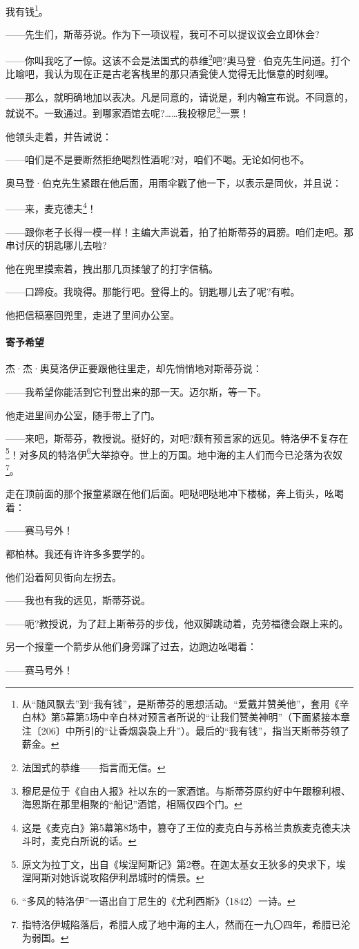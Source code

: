 \par 我有钱\footnote{从“随风飘去”到“我有钱”，是斯蒂芬的思想活动。“爱戴并赞美他”，套用《辛白林》第5幕第5场中辛白林对预言者所说的“让我们赞美神明”（下面紧接本章注〔206〕中所引的“让香烟袅袅上升”）。最后的“我有钱”，指当天斯蒂芬领了薪金。}。
\par ——先生们，斯蒂芬说。作为下一项议程，我可不可以提议议会立即休会?
\par ——你叫我吃了一惊。这该不会是法国式的恭维\footnote{法国式的恭维——指言而无信。}吧?奥马登·伯克先生问道。打个比喻吧，我认为现在正是古老客栈里的那只酒瓮使人觉得无比惬意的时刻哩。
\par ——那么，就明确地加以表决。凡是同意的，请说是，利内翰宣布说。不同意的，就说不。一致通过。到哪家酒馆去呢?……我投穆尼\footnote{穆尼是位于《自由人报》社以东的一家酒馆。与斯蒂芬原约好中午跟穆利根、海恩斯在那里相聚的“船记”酒馆，相隔仅四个门。}一票！
\par 他领头走着，并告诫说：
\par ——咱们是不是要断然拒绝喝烈性酒呢?对，咱们不喝。无论如何也不。
\par 奥马登·伯克先生紧跟在他后面，用雨伞戳了他一下，以表示是同伙，并且说：
\par ——来，麦克德夫\footnote{这是《麦克白》第5幕第8场中，篡夺了王位的麦克白与苏格兰贵族麦克德夫决斗时，麦克白所说的话。}！
\par ——跟你老子长得一模一样！主编大声说着，拍了拍斯蒂芬的肩膀。咱们走吧。那串讨厌的钥匙哪儿去啦?
\par 他在兜里摸索着，拽出那几页揉皱了的打字信稿。
\par ——口蹄疫。我晓得。那能行吧。登得上的。钥匙哪儿去了呢?有啦。
\par 他把信稿塞回兜里，走进了里间办公室。
\paragraph*{寄予希望}
\par 杰·杰·奥莫洛伊正要跟他往里走，却先悄悄地对斯蒂芬说：
\par ——我希望你能活到它刊登出来的那一天。迈尔斯，等一下。
\par 他走进里间办公室，随手带上了门。
\par ——来吧，斯蒂芬，教授说。挺好的，对吧?颇有预言家的远见。特洛伊不复存在\footnote{原文为拉丁文，出自《埃涅阿斯记》第2卷。在迦太基女王狄多的央求下，埃涅阿斯对她诉说攻陷伊利昂城时的情景。}！对多风的特洛伊\footnote{“多风的特洛伊”一语出自丁尼生的《尤利西斯》（1842）一诗。}大举掠夺。世上的万国。地中海的主人们而今已沦落为农奴\footnote{指特洛伊城陷落后，希腊人成了地中海的主人，然而在一九〇四年，希腊已沦为弱国。}。
\par 走在顶前面的那个报童紧跟在他们后面。吧哒吧哒地冲下楼梯，奔上街头，吆喝着：
\par ——赛马号外！
\par 都柏林。我还有许许多多要学的。
\par 他们沿着阿贝街向左拐去。
\par ——我也有我的远见，斯蒂芬说。
\par ——呃?教授说，为了赶上斯蒂芬的步伐，他双脚跳动着，克劳福德会跟上来的。
\par 另一个报童一个箭步从他们身旁蹿了过去，边跑边吆喝着：
\par ——赛马号外！
